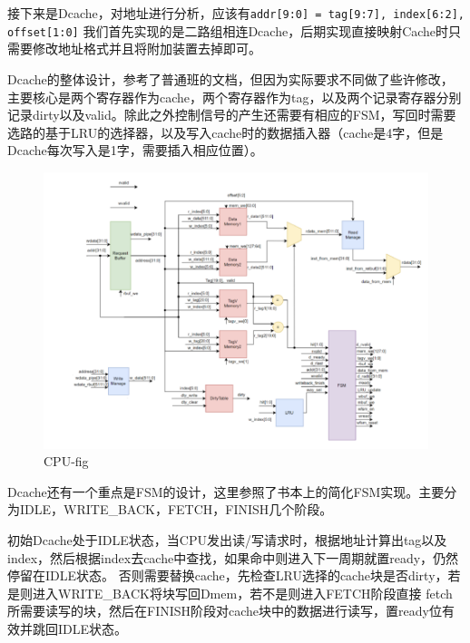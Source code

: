 \documentclass[a4paper]{article}
\begin{document}
接下来是Dcache，对地址进行分析，应该有\texttt{addr[9:0] = {tag[9:7], index[6:2], offset[1:0]}}
我们首先实现的是二路组相连Dcache，后期实现直接映射Cache时只需要修改地址格式并且将附加装置去掉即可。

Dcache的整体设计，参考了普通班的文档，但因为实际要求不同做了些许修改，主要核心是两个寄存器作为cache，两个寄存器作为tag，以及两个记录寄存器分别
记录dirty以及valid。除此之外控制信号的产生还需要有相应的FSM，写回时需要选路的基于LRU的选择器，以及写入cache时的数据插入器（cache是4字，但是Dcache每次写入是1字，需要插入相应位置）。

\begin{figure}[H]
    \centering
    \includegraphics[width=1.0\textwidth]{1.png}
    \caption{CPU-fig}
    \label{fig:Dmem}
\end{figure}

Dcache还有一个重点是FSM的设计，这里参照了书本上的简化FSM实现。主要分为IDLE，WRITE\_BACK，FETCH，FINISH几个阶段。

初始Dcache处于IDLE状态，当CPU发出读/写请求时，根据地址计算出tag以及index，然后根据index去cache中查找，如果命中则进入下一周期就置ready，仍然停留在IDLE状态。
否则需要替换cache，先检查LRU选择的cache块是否dirty，若是则进入WRITE\_BACK将块写回Dmem，若不是则进入FETCH阶段直接
fetch所需要读写的块，然后在FINISH阶段对cache块中的数据进行读写，置ready位有效并跳回IDLE状态。
\end{document}
